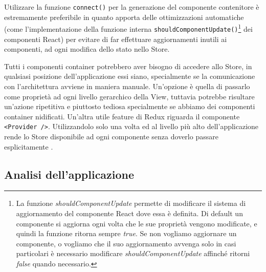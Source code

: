 \noindent
Utilizzare la funzione \texttt{connect()} per la generazione del componente contenitore è estremamente preferibile in quanto apporta delle ottimizzazioni automatiche (come l'implementazione della funzione interna \texttt{shouldComponentUpdate()}\footnote{La funzione \textit{shouldComponentUpdate} permette di modificare il sistema di aggiornamento del componente React dove essa è definita. Di default un componente si aggiorna ogni volta che le sue proprietà vengono modificate, e quindi la funzione ritorna sempre \textit{true}. Se non vogliamo aggiornare un componente, o vogliamo che il suo aggiornamento avvenga solo in casi particolari è necessario modificare \textit{shouldComponentUpdate} affinché ritorni \textit{false} quando necessario.} dei componenti React) per evitare di far effettuare aggiornamenti inutili ai componenti, ad ogni modifica dello stato nello Store.

Tutti i componenti container potrebbero aver bisogno di accedere allo Store, in qualsiasi posizione dell'applicazione essi siano, specialmente se la comunicazione con l'architettura avviene in maniera manuale. Un'opzione è quella di passarlo come proprietà ad ogni livello gerarchico della View, tuttavia potrebbe risultare un'azione ripetitiva e piuttosto tediosa specialmente se abbiamo dei componenti container nidificati. Un'altra utile feature di Redux riguarda il componente \texttt{<Provider />}. Utilizzandolo solo una volta ed al livello più alto dell'applicazione rende lo Store disponibile ad ogni componente senza doverlo passare esplicitamente \cite{ReduxDocumentation}.

\subsection{Analisi dell'applicazione}

